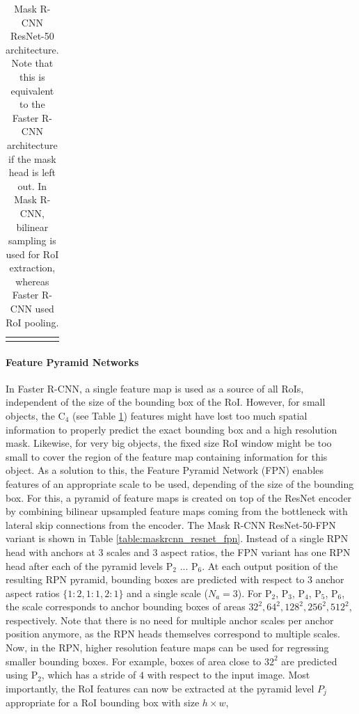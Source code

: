 {\begin{longtable}{llr}
\bottomrule

\caption {
Mask R-CNN \cite{MaskRCNN} ResNet-50 \cite{ResNet} architecture.
Note that this is equivalent to the Faster R-CNN architecture if the mask
head is left out. In Mask R-CNN, bilinear sampling is used for RoI extraction,
whereas Faster R-CNN used RoI pooling.
}
\label{table:maskrcnn_resnet}
\end{longtable}
}

\paragraph{Feature Pyramid Networks}
In Faster R-CNN, a single feature map is used as a source of all RoIs, independent
of the size of the bounding box of the RoI.
However, for small objects, the C$_4$ (see Table \ref{table:maskrcnn_resnet}) features
might have lost too much spatial information to properly predict the exact bounding
box and a high resolution mask. Likewise, for very big objects, the fixed size
RoI window might be too small to cover the region of the feature map containing
information for this object.
As a solution to this, the Feature Pyramid Network (FPN) \cite{FPN} enables features
of an appropriate scale to be used, depending of the size of the bounding box.
For this, a pyramid of feature maps is created on top of the ResNet \cite{ResNet}
encoder by combining bilinear upsampled feature maps coming from the bottleneck
with lateral skip connections from the encoder.
The Mask R-CNN ResNet-50-FPN variant is shown in Table \ref{table:maskrcnn_resnet_fpn}.
Instead of a single RPN head with anchors at 3 scales and 3 aspect ratios,
the FPN variant has one RPN head after each of the pyramid levels P$_2$ ... P$_6$.
At each output position of the resulting RPN pyramid, bounding boxes are predicted
with respect to 3 anchor aspect ratios $\{1:2, 1:1, 2:1\}$ and a single scale ($N_a = 3$).
For P$_2$, P$_3$, P$_4$, P$_5$, P$_6$,
the scale corresponds to anchor bounding boxes of areas $32^2, 64^2, 128^2, 256^2, 512^2$,
respectively.
Note that there is no need for multiple anchor scales per anchor position anymore,
as the RPN heads themselves correspond to multiple scales.
Now, in the RPN, higher resolution feature maps can be used for regressing smaller
bounding boxes. For example, boxes of area close to $32^2$ are predicted using P$_2$,
which has a stride of $4$ with respect to the input image.
Most importantly, the RoI features can now be extracted at the pyramid level $P_j$ appropriate for a
RoI bounding box with size $h \times w$,

